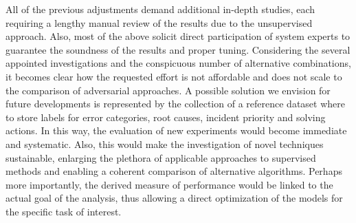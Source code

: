 All of the previous adjustments demand additional in-depth studies, each requiring a lengthy manual review of the results due to the unsupervised approach.
Also, most of the above solicit direct participation of system experts to guarantee the soundness of the results and proper tuning.
Considering the several appointed investigations and the conspicuous number of alternative combinations, it becomes clear how the requested effort is not affordable and does not scale to the comparison of adversarial approaches.
A possible solution we envision for future developments is represented by the collection of a reference dataset where to store labels for error categories, root causes, incident priority and solving actions. 
In this way, the evaluation of new experiments would become immediate and systematic.
Also, this would make the investigation of novel techniques sustainable, enlarging the plethora of applicable approaches to supervised methods and enabling a coherent comparison of alternative algorithms.
Perhaps more importantly, the derived measure of performance would be linked to the actual goal of the analysis, thus allowing a direct optimization of the models for the specific task of interest.







